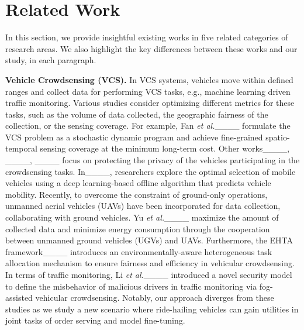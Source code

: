 \section{Related Work}
In this section, we provide insightful existing works in five related categories of research areas. We also highlight the key differences between these works and our study, in each paragraph.


\smallskip
\noindent\textbf{Vehicle Crowdsensing (VCS).}
In VCS systems, vehicles move within defined ranges and collect data for performing VCS tasks, e.g., machine learning driven traffic monitoring. Various studies consider optimizing different metrics for these tasks, such as the volume of data collected, the geographic fairness of the collection, or the sensing coverage. For example, Fan \emph{et al.}____ formulate the VCS problem as a stochastic dynamic program and achieve fine-grained spatio-temporal sensing coverage at the minimum long-term cost. Other works____, ____, ____ focus on protecting the privacy of the vehicles participating in the crowdsensing tasks. In____, researchers explore the optimal selection of mobile vehicles using a deep learning-based offline algorithm that predicts vehicle mobility. Recently, to overcome the constraint of ground-only operations, unmanned aerial vehicles (UAVs) have been incorporated for data collection, collaborating with ground vehicles. Yu \emph{et al.}____ maximize the amount of collected data and minimize energy consumption through the cooperation between unmanned ground vehicles (UGVs) and UAVs. 
Furthermore, the EHTA framework____ introduces an environmentally-aware heterogeneous task allocation mechanism to ensure fairness and efficiency in vehicular crowdsensing.
In terms of traffic monitoring, Li \emph{et al.}____ introduced a novel security model to define the misbehavior of malicious drivers in traffic monitoring via fog-assisted vehicular crowdsensing.
Notably, our approach diverges from these studies as we study a new scenario where ride-hailing vehicles can gain utilities in joint tasks of order serving and model fine-tuning.

